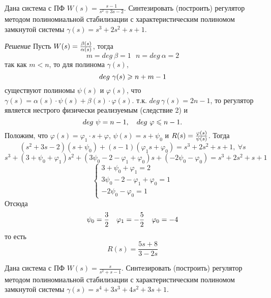 \documentclass[../../TAU.tex]{subfiles}
\begin{document}
    \examp
    {
        Дана система с ПФ $W(s) = \frac{s-1}{s^2+3s-2}$. Синтезировать (построить) регулятор методом полиномиальной стабилизации с характеристическим полиномом замкнутой системы $\gamma(s) = s^3+2s^2+s+1$.
    }

    \textit{Решение}
    {
        Пусть $W(s) = {\beta(s)\over \alpha(s)}$, тогда
        $$
            m=deg\ \beta =1 \ \ \ n=deg\ \alpha=2
        $$
        так как $m<n$, то для полинома $\gamma(s)$,
        $$
            deg\ \gamma(s) \geqslant n + m - 1
        $$
        существуют полиномы $\psi(s)$ и $\varphi(s)$, что $\gamma(s)=\alpha(s)\cdot\psi(s)+\beta(s)\cdot\varphi(s)$.
        т.к. $deg\ \gamma(s)=2n-1$, то регулятор является нестрого физически реализуемым (следствие 2) и
        $$
            deg\ \psi=n-1,\ \ \  deg\ \varphi \leqslant n-1.
        $$
        Положим, что $\varphi(s)=\varphi_1\cdot s+\varphi$, $\psi(s)=s+\psi_0$ и 
        $R(s)={\varphi(s)\over\psi(s)}$.
        Тогда
        $$
            (s^2+3s-2)(s+\psi_0)+(s-1)(\varphi_1s+\varphi_0)=s^3+2s^2+s+1,\ \forall s
        $$ 
        $$
            s^3+(3+\psi_0+\varphi_1)s^2+(3\psi_0-2-\varphi_1+\varphi_0)s+(-2\psi_0-\varphi_0)=s^3+2s^2+s+1
        $$
        $$
        \begin{cases}
            3+\psi_0+\varphi_1=2 \\
            3\psi_0-2-\varphi_1+\varphi_0=1 \\
            -2\psi_0-\varphi_0=1
        \end{cases}
        $$
        Отсюда
        $$
            \psi_0={3\over2} \ \ \ \varphi_1= -{5\over2} \ \ \  \varphi_0=-4
        $$
        то есть
        $$
            R(s)=\frac{5s+8}{3-2s}
        $$
    }

    \examp
    {
        Дана система с ПФ $W(s) = \frac{s}{s^2+s-1}$. Синтезировать (построить) регулятор методом полиномиальной стабилизации с характеристическим полиномом замкнутой системы $\gamma(s) = s^4+3s^3+4s^2+3s+1$.
    }
\end{document}
